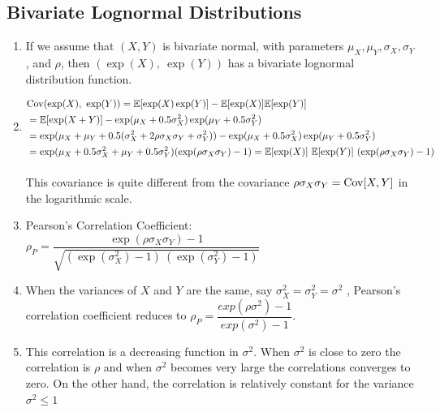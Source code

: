 \subsection{Bivariate Lognormal Distributions}

\begin{enumerate}
    \item  If we assume that $(X, Y)$ is bivariate normal, with parameters $\mu_X , \mu_Y , \sigma_X , \sigma_Y$ , and $\rho$, then $(\exp(X),\ \exp(Y ))$ has a bivariate lognormal distribution function.
    \hfill \cite{statistics/book/Statistics-for-Data-Scientists/Maurits-Kaptein}

    \item 
    $
        \begin{aligned}
            &\text{Cov}(\exp(X),\ \exp(Y )) 
            = \mathbb{E}[\exp(X) \exp(Y )] - \mathbb{E}[\exp(X)]\mathbb{E}[\exp(Y )] \\
            &= \mathbb{E}[\exp(X + Y )] - \exp(\mu_X + 0.5\sigma^2_X ) \exp(\mu_Y + 0.5\sigma^2_Y ) \\
            &= \exp(\mu_X + \mu_Y + 0.5(\sigma^2_X + 2\rho\sigma_X \sigma_Y + \sigma^2_Y )) - \exp(\mu_X + 0.5\sigma^2_X ) \exp(\mu_Y + 0.5\sigma^2_Y )\\
            &= \exp(\mu_X + 0.5\sigma^2_X + \mu_Y + 0.5\sigma^2_Y )(\exp(\rho\sigma_X \sigma_Y ) - 1)
            = \mathbb{E}[\exp(X)]\ \mathbb{E}[\exp(Y )]\ (\exp(\rho\sigma_X \sigma_Y ) - 1)
        \end{aligned}
    $
    \hfill \cite{statistics/book/Statistics-for-Data-Scientists/Maurits-Kaptein}
    \\
    This covariance is quite different from the covariance $\rho \sigma_X \sigma_Y = \text{Cov}[X, Y] $ in the logarithmic scale.
    \hfill \cite{statistics/book/Statistics-for-Data-Scientists/Maurits-Kaptein}

    \item Pearson’s Correlation Coefficient: 
    $ 
        \rho_P 
        = \dfrac{\exp(\rho\sigma_X \sigma_Y ) - 1 }{\sqrt{(\exp(\sigma^2_X ) - 1)\ (\exp(\sigma^2_Y ) - 1)}}
    $
    \hfill \cite{statistics/book/Statistics-for-Data-Scientists/Maurits-Kaptein}

    \item When the variances of $X$ and $Y$ are the same, say $\sigma^2_X = \sigma^2_Y = \sigma^2$ , Pearson’s correlation coefficient reduces to $\rho_P = \dfrac{exp(\rho\sigma^2) - 1}{exp(\sigma^2) - 1}$. 
    \hfill \cite{statistics/book/Statistics-for-Data-Scientists/Maurits-Kaptein}

    \item This correlation is a decreasing function in $\sigma^2$. 
    When $\sigma^2$ is close to zero the correlation is $\rho$ and when $\sigma^2$ becomes very large the correlations converges to zero. 
    On the other hand, the correlation is relatively constant for the variance $\sigma^2 \leq 1$
    \hfill \cite{statistics/book/Statistics-for-Data-Scientists/Maurits-Kaptein}

    
\end{enumerate}



